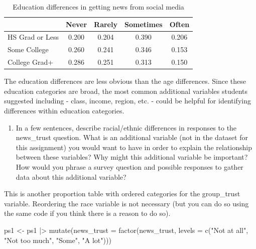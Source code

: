 \documentclass[
  letterpaper,
  DIV=11,
  numbers=noendperiod]{scrartcl}
\newenvironment{Shaded}{\begin{snugshade}}{\end{snugshade}}
\newcommand{\AttributeTok}[1]{\textcolor[rgb]{0.40,0.45,0.13}{#1}}
\newcommand{\FunctionTok}[1]{\textcolor[rgb]{0.28,0.35,0.67}{#1}}
\newcommand{\NormalTok}[1]{\textcolor[rgb]{0.00,0.23,0.31}{#1}}
\newcommand{\OtherTok}[1]{\textcolor[rgb]{0.00,0.23,0.31}{#1}}
\newcommand{\SpecialCharTok}[1]{\textcolor[rgb]{0.37,0.37,0.37}{#1}}
\newcommand{\StringTok}[1]{\textcolor[rgb]{0.13,0.47,0.30}{#1}}
\providecommand{\tightlist}{%
  \setlength{\itemsep}{0pt}\setlength{\parskip}{0pt}}\usepackage{longtable,booktabs,array}
\begin{document}
\begin{table}[!h]

\caption{Education differences in getting news from social media}
\centering
\begin{tabular}[t]{lcccc}
\toprule
  & Never & Rarely & Sometimes & Often\\
\midrule
HS Grad or Less & 0.200 & 0.204 & 0.390 & 0.206\\
Some College & 0.260 & 0.241 & 0.346 & 0.153\\
College Grad+ & 0.286 & 0.251 & 0.313 & 0.150\\
\bottomrule
\end{tabular}
\end{table}

The education differences are less obvious than the age differences.
Since these education categories are broad, the most common additional
variables students suggested including - class, income, region, etc. -
could be helpful for identifying differences within education
categories.

\begin{enumerate}
\def\labelenumi{\arabic{enumi}.}
\setcounter{enumi}{2}
\tightlist
\item
  In a few sentences, describe racial/ethnic differences in responses to
  the news\_trust question. What is an additional variable (not in the
  dataset for this assignment) you would want to have in order to
  explain the relationship between these variables? Why might this
  additional variable be important? How would you phrase a survey
  question and possible responses to gather data about this additional
  variable?
\end{enumerate}

This is another proportion table with ordered categories for the
group\_trust variable. Reordering the race variable is not necessary
(but you can do so using the same code if you think there is a reason to
do so).

\begin{Shaded}
\begin{Highlighting}[]
\NormalTok{ps1 }\OtherTok{\textless{}{-}}\NormalTok{ ps1 }\SpecialCharTok{|\textgreater{}} 
  \FunctionTok{mutate}\NormalTok{(}\AttributeTok{news\_trust =} \FunctionTok{factor}\NormalTok{(news\_trust,}
         \AttributeTok{levels =} \FunctionTok{c}\NormalTok{(}\StringTok{"Not at all"}\NormalTok{,}
                    \StringTok{"Not too much"}\NormalTok{,}
                    \StringTok{"Some"}\NormalTok{,}
                    \StringTok{"A lot"}\NormalTok{)))}
\end{Highlighting}
\end{Shaded}
\end{document}
